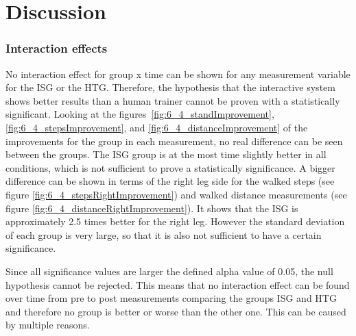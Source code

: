 \section{Discussion}\label{6_discussion}

\subsubsection{Interaction effects}\label{6_5_interactionEffects}
No interaction effect for group x time can be shown for any measurement variable for the ISG or the HTG.
Therefore, the hypothesis that the interactive system shows better results than a human trainer cannot be proven with a statistically significant.
Looking at the figures~\ref{fig:6_4_standImprovement}, \ref{fig:6_4_stepsImprovement}, and \ref{fig:6_4_distanceImprovement} of the improvements for the group in each measurement, no real difference can be seen between the groups.
The ISG group is at the most time slightly better in all conditions, which is not sufficient to prove a statistically significance.
A bigger difference can be shown in terms of the right leg side for the walked steps (see figure \ref{fig:6_4_stepsRightImprovement}) and walked distance measurements (see figure \ref{fig:6_4_distanceRightImprovement}).
It shows that the ISG is approximately 2.5 times better for the right leg.
However the standard deviation of each group is very large, so that it is also not sufficient to have a certain significance.

Since all significance values are larger the defined alpha value of 0.05, the null hypothesis cannot be rejected.
This means that no interaction effect can be found over time from pre to post measurements comparing the groups ISG and HTG and therefore no group is better or worse than the other one.
This can be caused by multiple reasons.

